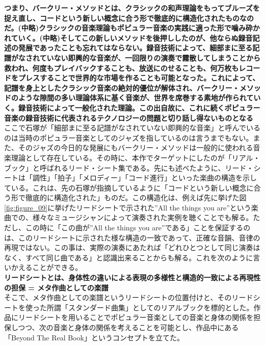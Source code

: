 \documentclass[uplatex,dvipdfmx]{ujarticle}
\begin{document}
{\bf つまり、バークリー・メソッドとは、クラシックの和声理論をもってブルーズを捉え直し、コードという新しい概念に合う形で徹底的に構造化されたものなのだ。(中略)クラシックの音楽理論もポピュラー音楽の実践に適った形で噛み砕かれていく。(中略)そしてこの新しいメソッドを後押ししたのが、他ならぬ録音記述の発展であったことも忘れてはならない。録音技術によって、細部まに至る記譜がなされていない即興的な音楽が、一回限りの演奏で霧散してしまうことから救われ、何度もプレイバックすることも、放送にのせることも、何万枚もレコードをプレスすることで世界的な市場を作ることも可能となった。これによって、記譜を身上としたクラシック音楽の絶対的優位が解体され、バークリー・メソッドのような隙間の多い理論体系に基く音楽が、世界を席巻する素地が作られていく。録音技術によって一般化された理論。この出自故に、これに続くポピュラー音楽の録音技術に代表されるテクノロジーの問題と切り話し得ないものとなる}\\

ここで石塚が「細部まに至る記譜がなされていない即興的な音楽」と呼んでいるのは当時のポピュラー音楽としてのジャズを指しているのは言うまでもない。また、そのジャズの今日的な発展にもバークリー・メソッドは一般的に使われる音楽理論として存在している。その時に、本作でターゲットにしたのが「リアル・ブック」と呼ばれるリード・シート集である。先にも述べたように、リード・シートは「調性」「拍子」「メロディー」「コード進行」といった楽曲の構造を示している。これは、先の石塚が指摘しているように「コードという新しい概念に合う形で徹底的に構造化された」ものだ。この構造化は、例えば先に挙げた図\ref{fig:figure_09}に挙げたリードシートで示された''All the things you are''という楽曲での、様々なミュージシャンによって演奏された実例を聴くことでも解る。ただし、この時に「この曲が''All the things you are''である」ことを保証するのは、このリードシートに示された様な構造の一致であって、正確な音韻、音律の再現ではない。この事は、実際の演奏にあたれば「どれひとつとして同じ演奏はなく、すべて同じ曲である」と認識出来ることからも解る。これを次のように言いかえることができる。\\

{\bf リードシートとは、身体性の違いによる表現の多様性と構造的一致による再現性の担保 = メタ作曲としての楽譜}\\

そこで、メタ作曲としての楽譜というリードシートの位置付けと、そのリードシートを使った所謂「スタンダード曲集」としてのリアルブックを標的とした。作品にリードシートを用いることでポピュラー音楽としての音楽と身体の関係を担保しつつ、次の音楽と身体の関係を考えることを可能とし、作品中にある「Beyond The Real Book」というコンセプトを立てた。
\end{document}
